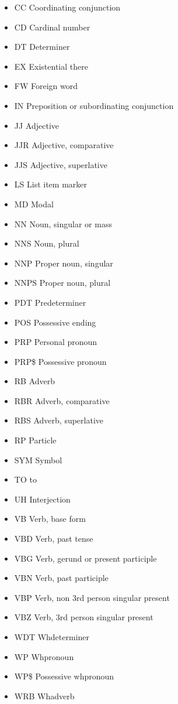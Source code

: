 \begin{multicols}{2}
\begin{itemize}
  \item CC Coordinating conjunction
  \item CD Cardinal number
  \item DT Determiner
  \item EX Existential there
  \item FW Foreign word
  \item IN Preposition or subordinating conjunction
  \item JJ Adjective
  \item JJR Adjective, comparative
  \item JJS Adjective, superlative
  \item LS List item marker
  \item MD Modal
  \item NN Noun, singular or mass
  \item NNS Noun, plural
  \item NNP Proper noun, singular
  \item NNPS Proper noun, plural
  \item PDT Predeterminer
  \item POS Possessive ending
  \item PRP Personal pronoun
  \item PRP\$ Possessive pronoun
  \item RB Adverb
  \item RBR Adverb, comparative
  \item RBS Adverb, superlative
  \item RP Particle
  \item SYM Symbol
  \item TO to
  \item UH Interjection
  \item VB Verb, base form
  \item VBD Verb, past tense
  \item VBG Verb, gerund or present participle
  \item VBN Verb, past participle
  \item VBP Verb, non 3rd person singular present
  \item VBZ Verb, 3rd person singular present
  \item WDT Whdeterminer
  \item WP Whpronoun
  \item WP\$ Possessive whpronoun
  \item WRB Whadverb
\end{itemize}
\end{multicols}

